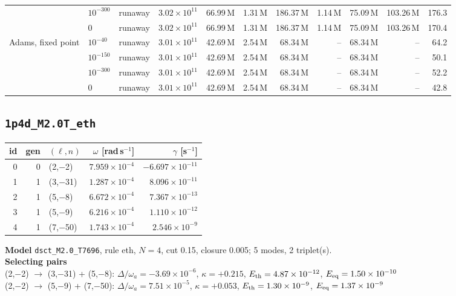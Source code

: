 {\begin{tabular}{@{}llllrrrrrrr@{}}
 & $10^{-300}$ & runaway & $3.02\times10^{11}$ & 66.99\,M & 1.31\,M & 186.37\,M & 1.14\,M & 75.09\,M & 103.26\,M & 176.3 \\
 & $0$ & runaway & $3.02\times10^{11}$ & 66.99\,M & 1.31\,M & 186.37\,M & 1.14\,M & 75.09\,M & 103.26\,M & 170.4 \\
\addlinespace[2pt]
Adams, fixed point & $10^{-40}$ & runaway & $3.01\times10^{11}$ & 42.69\,M & 2.54\,M & 68.34\,M & -- & 68.34\,M & -- & 64.2 \\
 & $10^{-150}$ & runaway & $3.01\times10^{11}$ & 42.69\,M & 2.54\,M & 68.34\,M & -- & 68.34\,M & -- & 50.1 \\
 & $10^{-300}$ & runaway & $3.01\times10^{11}$ & 42.69\,M & 2.54\,M & 68.34\,M & -- & 68.34\,M & -- & 52.2 \\
 & $0$ & runaway & $3.01\times10^{11}$ & 42.69\,M & 2.54\,M & 68.34\,M & -- & 68.34\,M & -- & 42.8 \\
\bottomrule
\end{tabular}}

\clearpage
\subsection{\texttt{1p4d\_M2.0T\_eth}}\label{net:1p4d_M2.0T_eth}
\noindent\begin{minipage}[t]{0.43\textwidth}\vspace{0pt}\footnotesize
\begin{tabular}{@{}rrlrr@{}}
\toprule
id & gen & $(\ell,n)$ & $\omega$ [rad\,s$^{-1}$] & $\gamma$ [s$^{-1}$] \\
\midrule
0 & 0 & (2,$-$2) & $7.959\times10^{-4}$ & $-6.697\times10^{-11}$ \\
1 & 1 & (3,$-$31) & $1.287\times10^{-4}$ & $8.096\times10^{-11}$ \\
2 & 1 & (5,$-$8) & $6.672\times10^{-4}$ & $7.367\times10^{-13}$ \\
3 & 1 & (5,$-$9) & $6.216\times10^{-4}$ & $1.110\times10^{-12}$ \\
4 & 1 & (7,$-$50) & $1.743\times10^{-4}$ & $2.546\times10^{-9}$ \\
\bottomrule
\end{tabular}
\end{minipage}\hfill
\begin{minipage}[t]{0.55\textwidth}\vspace{0pt}\footnotesize
\textbf{Model} \texttt{dsct\_M2.0\_T7696}, rule eth, $N=4$, cut 0.15,
closure 0.005; 5 modes, 2 triplet(s).\\[2pt]
\textbf{Selecting pairs}\\ (2,$-$2) $\to$ (3,$-$31) + (5,$-$8): $\Delta/\omega_a=-3.69\times10^{-6}$, $\kappa=+0.215$, $E_{\rm th}=4.87\times10^{-12}$, $E_{\rm eq}=1.50\times10^{-10}$\\
(2,$-$2) $\to$ (5,$-$9) + (7,$-$50): $\Delta/\omega_a=7.51\times10^{-5}$, $\kappa=+0.053$, $E_{\rm th}=1.30\times10^{-9}$, $E_{\rm eq}=1.37\times10^{-9}$\\[2pt]

\end{minipage}

